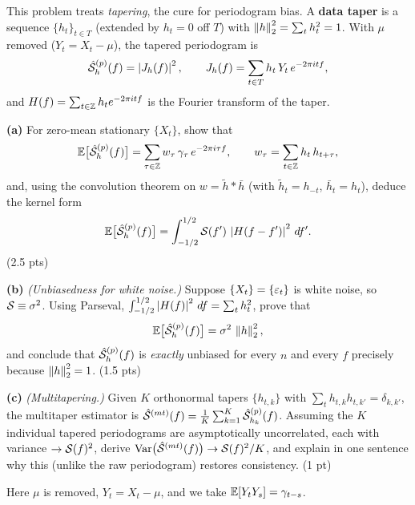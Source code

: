 \documentclass[11pt]{article}
\begin{document}
\statementstart
This problem treats \emph{tapering}, the cure for periodogram bias. A \textbf{data taper} is a sequence $\{h_t\}_{t\in T}$ (extended by $h_t=0$ off $T$) with $\left\lVert h \right\rVert_2^2=\sum_t h_t^2=1$. With $\mu$ removed ($Y_t=X_t-\mu$), the tapered periodogram is
\[
\hat{\mathcal{S}}^{(p)}_h(f)=\left\lvert J_h(f) \right\rvert^2,\qquad J_h(f)=\sum_{t\in T} h_t\,Y_t\,e^{-2\pi i t f},
\]
and $H(f)=\sum_{t\in\mathbb{Z}} h_t e^{-2\pi i t f}$ is the Fourier transform of the taper.

\textbf{(a)} For zero-mean stationary $\{X_t\}$, show that
\[
\mathbb{E}\bigl[\hat{\mathcal{S}}^{(p)}_h(f)\bigr]=\sum_{\tau\in\mathbb{Z}} w_\tau\,\gamma_\tau\,e^{-2\pi i\tau f},
\qquad
w_\tau=\sum_{t\in\mathbb{Z}} h_t\,h_{t+\tau},
\]
and, using the convolution theorem on $w=\tilde h * \bar h$ (with $\tilde h_t=h_{-t}$, $\bar h_t=h_t$), deduce the kernel form
\[
\mathbb{E}\bigl[\hat{\mathcal{S}}^{(p)}_h(f)\bigr]=\int_{-1/2}^{1/2}\mathcal{S}(f')\,\left\lvert H(f-f') \right\rvert^2\,df'.
\]
\hfill(2.5 pts)

\textbf{(b)} \emph{(Unbiasedness for white noise.)} Suppose $\{X_t\}=\{\varepsilon_t\}$ is white noise, so $\mathcal{S}\equiv\sigma^2$. Using Parseval, $\int_{-1/2}^{1/2}\left\lvert H(f) \right\rvert^2\,df=\sum_t h_t^2$, prove that
\[
\mathbb{E}\bigl[\hat{\mathcal{S}}^{(p)}_h(f)\bigr]=\sigma^2\,\left\lVert h \right\rVert_2^2 ,
\]
and conclude that $\hat{\mathcal{S}}^{(p)}_h(f)$ is \emph{exactly} unbiased for every $n$ and every $f$ precisely because $\left\lVert h \right\rVert_2^2=1$. \hfill(1.5 pts)

\textbf{(c)} \emph{(Multitapering.)} Given $K$ orthonormal tapers $\{h_{t,k}\}$ with $\sum_t h_{t,k}h_{t,k'}=\delta_{k,k'}$, the multitaper estimator is $\hat{\mathcal{S}}^{(mt)}(f)=\frac1K\sum_{k=1}^{K}\hat{\mathcal{S}}^{(p)}_{h_k}(f)$. Assuming the $K$ individual tapered periodograms are asymptotically uncorrelated, each with variance $\to\mathcal{S}(f)^2$, derive $\operatorname{Var}\bigl(\hat{\mathcal{S}}^{(mt)}(f)\bigr)\to\mathcal{S}(f)^2/K$, and explain in one sentence why this (unlike the raw periodogram) restores consistency. \hfill(1 pt)
\statementend

Here $\mu$ is removed, $Y_t=X_t-\mu$, and we take $\mathbb{E}[Y_tY_s]=\gamma_{t-s}$.
\end{document}
